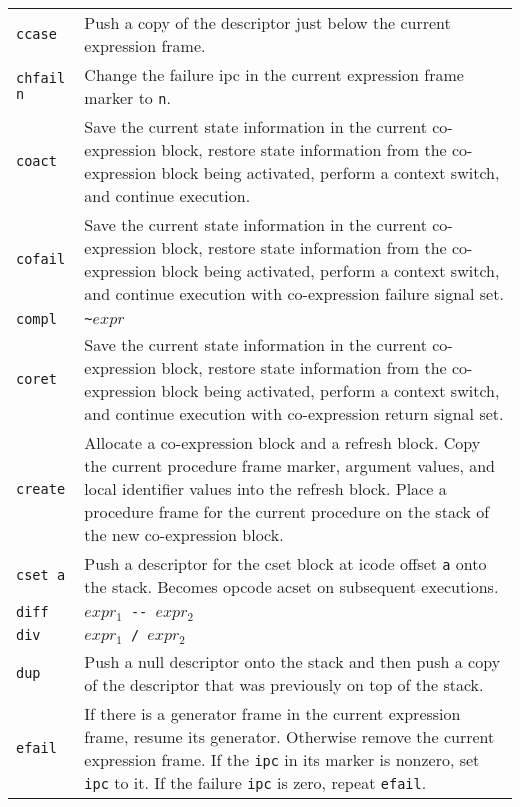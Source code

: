 \begin{xtabular}{l@{\hspace{1.5cm}}p{13.5cm}}
\texttt{ccase} & Push a copy of the descriptor just below the current expression frame.\\

\texttt{chfail n} &  Change the failure ipc in the current expression frame
marker to \texttt{n}.\\

\texttt{coact} & Save the current state information in the current co-expression
block, restore state information from the co-expression block being activated,
perform a context switch, and continue execution.\\

\texttt{cofail} & Save the current state information in the current
co-expression block, restore state information from the co-expression
block being activated, perform a context switch, and continue
execution with co-expression failure signal set.\\

\texttt{compl} & \texttt{\textasciitilde $expr$}\\

\texttt{coret} & Save the current state information in the current
co-expression block, restore state information from the co-expression
block being activated, perform a context switch, and continue
execution with co-expression return signal set.\\

\texttt{create} & Allocate a co-expression block and a refresh block. Copy the
current procedure frame marker, argument values, and local identifier
values into the refresh block. Place a procedure frame for the current
procedure on the stack of the new co-expression block.\\

\texttt{cset a} & Push a descriptor for the cset block at icode offset
\texttt{a} onto the stack. Becomes opcode acset on subsequent executions.\\

\texttt{diff}  & \texttt{$expr_1$ -{}- $expr_2$}\\

\texttt{div}   & \texttt{$expr_1$ / $expr_2$}\\

\texttt{dup}   & Push a null descriptor onto the stack and then push a copy of
the descriptor that was previously on top of the stack.\\

\texttt{efail} & If there is a generator frame in the current expression
frame, resume its generator. Otherwise remove the current expression
frame. If the \texttt{ipc} in its marker is nonzero, set \texttt{ipc} to it. If the
failure \texttt{ipc} is zero, repeat \texttt{efail}.\\


\end{xtabular}
